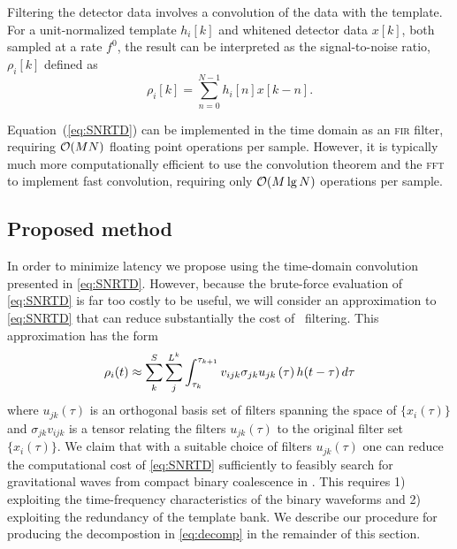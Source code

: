 Filtering the detector data involves a convolution of the data with the
template.  For a unit-normalized template $h_i[k]$ and whitened detector data $x[k]$, both sampled at a rate $f^0$, the result can be interpreted as the signal-to-noise ratio, $\rho_i[k]$ defined as
%
%
\begin{equation}
	\label{eq:SNRTD}
	\rho_i [k] = \sum_{n=0}^{N-1} h_{i}[n] x [k-n].
\end{equation}

Equation~(\ref{eq:SNRTD}) can be implemented in the time domain as an \textsc{fir} filter, requiring $\mathcal O(M N)$ floating point operations per sample.  However, it is typically much more computationally efficient to use the convolution theorem and the \textsc{fft} to implement fast convolution, requiring only $\mathcal O(M \lg N)$ operations per sample.

\subsection{Proposed method}

In order to minimize latency we propose using the time-domain convolution
presented in \eqref{eq:SNRTD}.  However, because the brute-force evaluation of
\eqref{eq:SNRTD} is far too costly to be useful, we will consider an
approximation to \eqref{eq:SNRTD} that can reduce substantially the cost of
\realtime\ filtering. This approximation has the form
%
%
\begin{equation}
\rho_i(t) \approx \sum_k^{S} \sum_j^{L^k} 
	\int_{\tau_{k}}^{\tau_{k+1}} v_{ijk} \sigma_{jk} u_{jk}\,(\tau) \, h(t-\tau) \, d \tau \label{eq:decomp}
\end{equation} 
%
%
where $u_{jk}(\tau)$ is an orthogonal basis set of filters spanning the space
of $\{x_i(\tau)\}$ and $\sigma_{jk} v_{ijk}$ is a tensor relating the filters
$u_{jk}(\tau)$ to the original filter set $\{x_i(\tau)\}$.  We claim that with
a suitable choice of filters $u_{jk}(\tau)$ one can reduce the computational
cost of \eqref{eq:SNRTD} sufficiently to feasibly search for
gravitational waves from compact binary coalescence in \realtime.  This
requires 1) exploiting
the time-frequency characteristics of the binary waveforms and 2) exploiting the redundancy of the template bank. We describe our
procedure for producing the decompostion in \eqref{eq:decomp} in the remainder
of this section.

